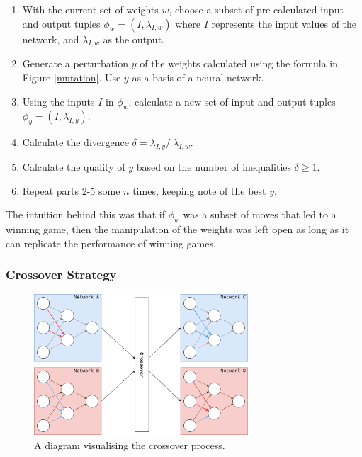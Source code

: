 \documentclass[12pt,a4paper]{article}
\begin{document}
             \begin{enumerate}
             \item With the current set of weights $w$, choose a subset of pre-calculated input and output tuples $\phi_{w} = (I, \lambda_{I,w})$ where $I$ represents the input values of the network, and $\lambda_{I,w}$ as the output.
             \item Generate a perturbation $y$ of the weights calculated using the formula in Figure \ref{mutation}. Use $y$ as a basis of a neural network. 
              \item Using the inputs $I$ in $\phi_{w}$, calculate a new set of input and output tuples $\phi_{y} = (I, \lambda_{I,y})$.
              \item Calculate the divergence $\delta = \lambda_{I,y} /\ \lambda_{I,w}.$ 
              \item Calculate the quality of $y$ based on the number of inequalities $\delta \geq 1$.
             \item Repeat parts 2-5 some $n$ times, keeping note of the best $y$. 
             \end{enumerate}

            The intuition behind this was that if $\phi_{w}$ was a subset of moves that led to a winning game, then the manipulation of the weights was left open as long as it can replicate the performance of winning games.
            
        \subsubsection{Crossover Strategy} \label{crossover_strategy}
      
           \begin{figure}[!ht]
                \centering
                \includegraphics[width=80mm]{images/crossover.png}
                \caption{A diagram visualising the crossover process.\label{crossoverpic}}
            \end{figure}
\end{document}
